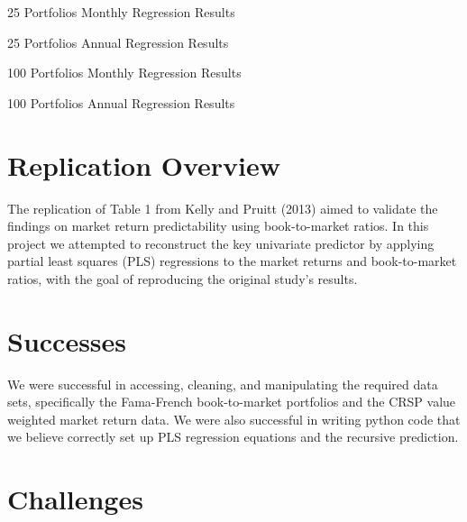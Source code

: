 \documentclass[12pt]{article}
\begin{document}
\begin{table}[ht]
    \centering
    \caption{25 Portfolios Monthly Regression Results}
    
\end{table}

\begin{table}[ht]
    \centering
    \caption{25 Portfolios Annual Regression Results}
    
\end{table}

\begin{table}[ht]
    \centering
    \caption{100 Portfolios Monthly Regression Results}
    
\end{table}

\begin{table}[ht]
    \centering
    \caption{100 Portfolios Annual Regression Results}
    
\end{table}


\doublespacing
\section{Replication Overview}

The replication of Table 1 from Kelly and Pruitt (2013) aimed to validate the 
findings on market return predictability using book-to-market ratios. In this project we 
attempted to reconstruct the key univariate predictor by applying partial least squares (PLS) 
regressions to the market returns and book-to-market ratios, with the goal of reproducing 
the original study’s results.

\doublespacing
\section{Successes}
We were successful in accessing, cleaning, and manipulating the required data sets, specifically 
the Fama-French book-to-market portfolios and the CRSP value weighted market return data. 
We were also successful in writing python code that we believe correctly set up PLS regression 
equations and the recursive prediction.

\doublespacing
\section{Challenges}
\end{document}

